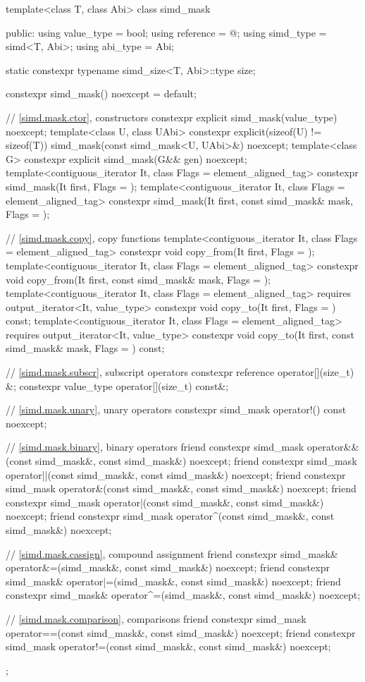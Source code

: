 \begin{codeblock}
template<class T, class Abi> class simd_mask {
public:
  using value_type = bool;
  using reference = @\seebelow@;
  using simd_type = simd<T, Abi>;
  using abi_type = Abi;

  static constexpr typename simd_size<T, Abi>::type size;

  constexpr simd_mask() noexcept = default;

  // \ref{simd.mask.ctor},  constructors
  constexpr explicit simd_mask(value_type) noexcept;
  template<class U, class UAbi>
    constexpr explicit(sizeof(U) != sizeof(T)) simd_mask(const simd_mask<U, UAbi>&) noexcept;
  template<class G> constexpr explicit simd_mask(G&& gen) noexcept;
  template<contiguous_iterator It, class Flags = element_aligned_tag>
    constexpr simd_mask(It first, Flags = {});
  template<contiguous_iterator It, class Flags = element_aligned_tag>
    constexpr simd_mask(It first, const simd_mask& mask, Flags = {});

  // \ref{simd.mask.copy},  copy functions
  template<contiguous_iterator It, class Flags = element_aligned_tag>
    constexpr void copy_from(It first, Flags = {});
  template<contiguous_iterator It, class Flags = element_aligned_tag>
    constexpr void copy_from(It first, const simd_mask& mask, Flags = {});
  template<contiguous_iterator It, class Flags = element_aligned_tag>
    requires output_iterator<It, value_type>
    constexpr void copy_to(It first, Flags = {}) const;
  template<contiguous_iterator It, class Flags = element_aligned_tag>
    requires output_iterator<It, value_type>
    constexpr void copy_to(It first, const simd_mask& mask, Flags = {}) const;

  // \ref{simd.mask.subscr},  subscript operators
  constexpr reference operator[](size_t) &;
  constexpr value_type operator[](size_t) const&;

  // \ref{simd.mask.unary},  unary operators
  constexpr simd_mask operator!() const noexcept;

  // \ref{simd.mask.binary},  binary operators
  friend constexpr simd_mask operator&&(const simd_mask&, const simd_mask&) noexcept;
  friend constexpr simd_mask operator||(const simd_mask&, const simd_mask&) noexcept;
  friend constexpr simd_mask operator&(const simd_mask&, const simd_mask&) noexcept;
  friend constexpr simd_mask operator|(const simd_mask&, const simd_mask&) noexcept;
  friend constexpr simd_mask operator^(const simd_mask&, const simd_mask&) noexcept;

  // \ref{simd.mask.cassign},  compound assignment
  friend constexpr simd_mask& operator&=(simd_mask&, const simd_mask&) noexcept;
  friend constexpr simd_mask& operator|=(simd_mask&, const simd_mask&) noexcept;
  friend constexpr simd_mask& operator^=(simd_mask&, const simd_mask&) noexcept;

  // \ref{simd.mask.comparison},  comparisons
  friend constexpr simd_mask operator==(const simd_mask&, const simd_mask&) noexcept;
  friend constexpr simd_mask operator!=(const simd_mask&, const simd_mask&) noexcept;
};
\end{codeblock}


